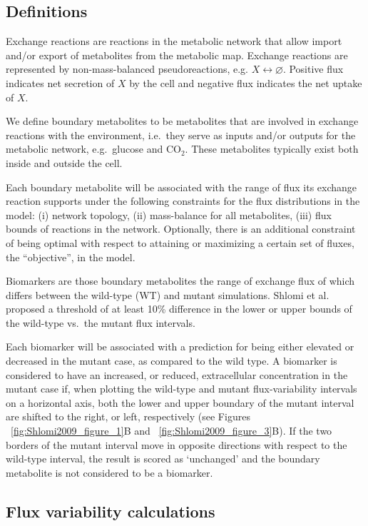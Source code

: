 \documentclass[10pt,a4paper,onecolumn]{article}
\begin{document}
\subsection{Definitions}\label{definitions}

Exchange reactions are reactions in the metabolic network that allow
import and/or export of metabolites from the metabolic map. Exchange
reactions are represented by non-mass-balanced pseudoreactions, e.g.
\(X \leftrightarrow \varnothing\). Positive flux indicates net secretion
of \(X\) by the cell and negative flux indicates the net uptake of
\(X\).

We define boundary metabolites to be metabolites that are involved in
exchange reactions with the environment, i.e.~they serve as inputs
and/or outputs for the metabolic network, e.g.~glucose and CO\(_2\).
These metabolites typically exist both inside and outside the cell.

Each boundary metabolite will be associated with the range of flux its
exchange reaction supports under the following constraints for the flux
distributions in the model: (i) network topology, (ii) mass-balance for
all metabolites, (iii) flux bounds of reactions in the network.
Optionally, there is an additional constraint of being optimal with
respect to attaining or maximizing a certain set of fluxes, the
``objective'', in the model.

Biomarkers are those boundary metabolites the range of exchange flux of
which differs between the wild-type (WT) and mutant simulations. Shlomi
et al. proposed a threshold of at least 10\% difference in the lower or
upper bounds of the wild-type vs.~the mutant flux intervals.

Each biomarker will be associated with a prediction for being either
elevated or decreased in the mutant case, as compared to the wild type.
A biomarker is considered to have an increased, or reduced,
extracellular concentration in the mutant case if, when plotting the
wild-type and mutant flux-variability intervals on a horizontal axis,
both the lower and upper boundary of the mutant interval are shifted to
the right, or left, respectively (see Figures
~\ref{fig:Shlomi2009_figure_1}B and ~\ref{fig:Shlomi2009_figure_3}B). If
the two borders of the mutant interval move in opposite directions with
respect to the wild-type interval, the result is scored as `unchanged'
and the boundary metabolite is not considered to be a biomarker.

\subsection{Flux variability
calculations}\label{flux-variability-calculations}
\end{document}
